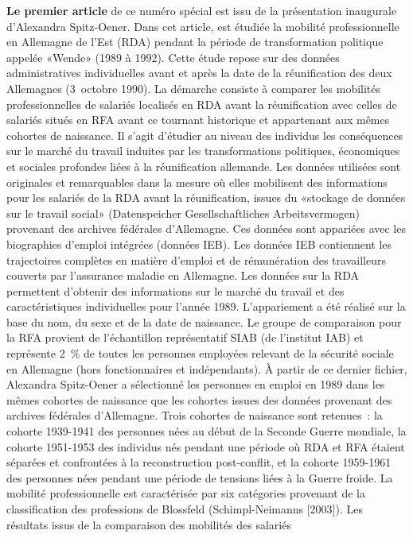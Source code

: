\begin{Article}
\begin{refsection}[Intro]
\medskip

\textbf{Le premier article} de ce numéro spécial est issu de la
présentation inaugurale d'Alexandra Spitz-Oener. Dans cet article, est
étudiée la mobilité professionnelle en Allemagne de l'Est (RDA) pendant
la période de transformation politique appelée «Wende»
(1989 à 1992). Cette étude repose sur des données administratives
individuelles avant et après la date de la réunification des deux
Allemagnes (3~octobre 1990). La démarche consiste à comparer les
mobilités professionnelles de salariés localisés en RDA avant la
réunification avec celles de salariés situés en RFA avant ce tournant
historique et appartenant aux mêmes cohortes de naissance. Il s'agit
d'étudier au niveau des individus les conséquences sur le marché du travail  
induites par les transformations politiques, économiques et sociales profondes
liées à la réunification allemande. Les données utilisées sont
originales et remarquables dans la mesure où elles mobilisent des
informations pour les salariés de la RDA avant la réunification, issues
du «stockage de données sur le travail social» (Datenspeicher
Gesellschaftliches Arbeitsvermogen) provenant des archives fédérales d'Allemagne. Ces données sont appariées avec les biographies
d'emploi intégrées (données IEB). Les données IEB
contiennent les trajectoires complètes en matière d'emploi et de
rémunération des travailleurs couverts par l'assurance maladie en
Allemagne. Les données sur la RDA permettent d'obtenir
des informations sur le marché du travail et des caractéristiques
individuelles pour l'année 1989. L'appariement a été réalisé sur la base
du nom, du sexe et de la date de naissance. Le groupe de comparaison
pour la RFA provient de l'échantillon représentatif SIAB (de
l'institut IAB) et représente 2~\% de toutes les personnes employées
relevant de la sécurité sociale en Allemagne (hors fonctionnaires et
indépendants). À partir de ce dernier fichier, Alexandra Spitz-Oener a
sélectionné les personnes en emploi en 1989 dans les mêmes cohortes de
naissance que les cohortes issues des données provenant des archives fédérales
d'Allemagne. Trois cohortes de naissance sont retenues~: la cohorte
1939-1941 des personnes nées au début de la Seconde Guerre mondiale, la
cohorte 1951-1953 des individus nés pendant une période où RDA et RFA étaient séparées et confrontées à la reconstruction post-conflit, et la cohorte 1959-1961 des personnes nées pendant une période de tensions liées à la Guerre froide. La
mobilité professionnelle est caractérisée par six catégories provenant
de la classification des professions de Blossfeld (Schimpl-Neimanns [2003]). Les résultats issus de la comparaison des mobilités des salariés

\end{refsection}
\end{Article}
